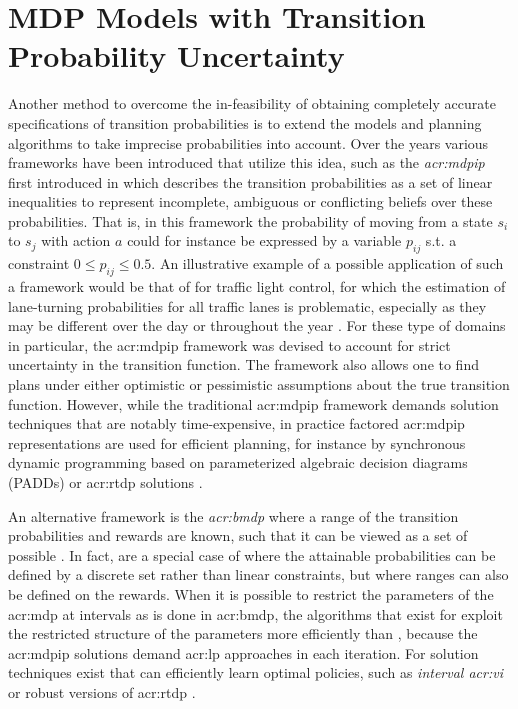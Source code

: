 
\section{MDP Models with Transition Probability Uncertainty}
\label{sec:mdp-uncertain-probabilities}

Another method to overcome the in-feasibility of obtaining completely accurate specifications of transition probabilities is to extend the models and planning algorithms to take imprecise probabilities into account.
Over the years various frameworks have been introduced that utilize this idea, such as the \textit{\acrfull{acr:mdpip}} first introduced in \cite{satia1973markovian} which describes the transition probabilities as a set of linear inequalities to represent incomplete, ambiguous or conflicting beliefs over these probabilities.
That is, in this framework the probability of moving from a state $s_i$ to $s_j$ with action $a$ could for instance be expressed by a variable $p_{ij}$ s.t. a constraint $0 \leq p_{ij} \leq 0.5$.
An illustrative example of a possible application of such a framework would be that of  for traffic light control, for which the estimation of lane-turning probabilities for all traffic lanes is problematic, especially as they may be different over the day or throughout the year \cite{delgado2011efficient}.
For these type of domains in particular, the \acrshort{acr:mdpip} framework was devised to account for strict uncertainty in the transition function.
The framework also allows one to find plans under either optimistic or pessimistic assumptions about the true transition function.
However, while the traditional \acrshort{acr:mdpip} framework demands solution techniques that are notably time-expensive, in practice factored \acrshort{acr:mdpip} representations are used for efficient planning, for instance by synchronous dynamic programming based on parameterized algebraic decision diagrams (PADDs) \cite{delgado2011efficient} or \acrshort{acr:rtdp} solutions \cite{delgado2016real}.

An alternative framework is the \textit{\acrfull{acr:bmdp}} where a range of the transition probabilities and rewards are known, such that it can be viewed as a set of possible .
In fact,  are a special case of  where the attainable probabilities can be defined by a discrete set rather than linear constraints, but where ranges can also be defined on the rewards.
When it is possible to restrict the parameters of the \acrshort{acr:mdp} at intervals as is done in \acrshort{acr:bmdp}, the algorithms that exist for  exploit the restricted structure of the parameters more efficiently than , because the \acrshort{acr:mdpip} solutions demand \acrshort{acr:lp} approaches in each iteration.
For  solution techniques exist that can efficiently learn optimal policies, such as \textit{interval \acrshort{acr:vi}} \cite{givan2000bounded} or robust versions of \acrshort{acr:rtdp} \cite{buffet2005robust}.

